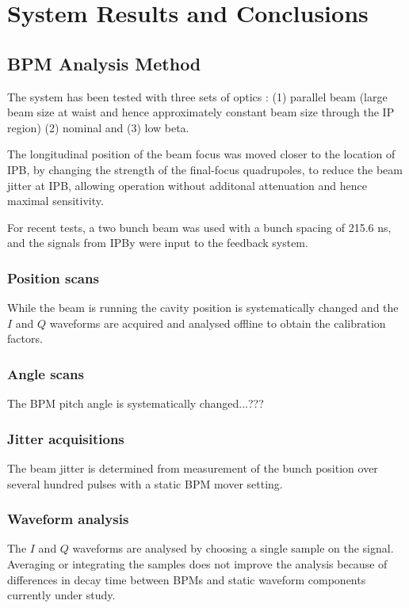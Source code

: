 \chapter{System Results and Conclusions}
\section{BPM Analysis Method}
The system has been tested with three sets of optics : (1) parallel beam (large beam size at waist and hence approximately constant beam size through the IP region) (2) nominal and (3) low beta.\par
The longitudinal position of the beam focus was moved closer to the location of IPB, by changing the strength of the final-focus quadrupoles, to reduce the beam jitter at IPB, allowing operation without additonal attenuation and hence maximal sensitivity.\par
For recent tests, a two bunch beam was used with a bunch spacing of 215.6 ns, and the signals from IPBy were input to the feedback system.\par
\subsection{Position scans}
While the beam is running the cavity position is systematically changed and the $I$ and $Q$ waveforms are acquired and analysed offline to obtain the calibration factors.\par
\subsection{Angle scans}
The BPM pitch angle is systematically changed...???
\subsection{Jitter acquisitions}
The beam jitter is determined from measurement of the bunch position over several hundred pulses with a static BPM mover setting.\par
\subsection{Waveform analysis}
The $I$ and $Q$ waveforms are analysed by choosing a single sample on the signal. Averaging or integrating the samples does not improve the analysis because of differences in decay time between BPMs and static waveform components currently under study.\par
